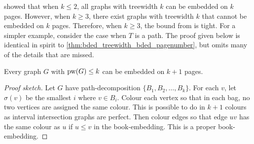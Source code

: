 \textcite{dujmovicGraphTreewidthGeometric2007} showed that when $k \leq 2$, all graphs with treewidth $k$ can be embedded on $k$ pages. However, when $k \geq 3$, there exist graphs with treewidth $k$ that cannot be embedded on $k$ pages. Therefore, when $k \geq 3$, the bound from \textcite{ganleyPagenumberTrees2001} is tight. 
For a simpler example, consider the case when $T$ is a path. The proof given below is identical in spirit to \cref{thm:bded_treewidth_bded_pagenumber}, but omits many of the details that are missed. 

\begin{theorem}
	Every graph \(G\) with \(\operatorname{pw}(G) \leq k\) can be embedded on $k + 1$ pages.
\end{theorem}

\begin{proof}[Proof sketch]
	Let $G$ have path-decomposition $\{B_1, B_2, \ldots , B_k\}$. For each $v$, let $\sigma(v)$ be the smallest $i$ where $v \in B_i$. Colour each vertex so that in each bag, no two vertices are assigned the same colour. This is possible to do in $k+1$ colours as interval intersection graphs are perfect. Then colour edges so that edge $uv$ has the same colour as $u$ if $u \leq v$ in the book-embedding. This is a proper book-embedding.
\end{proof}